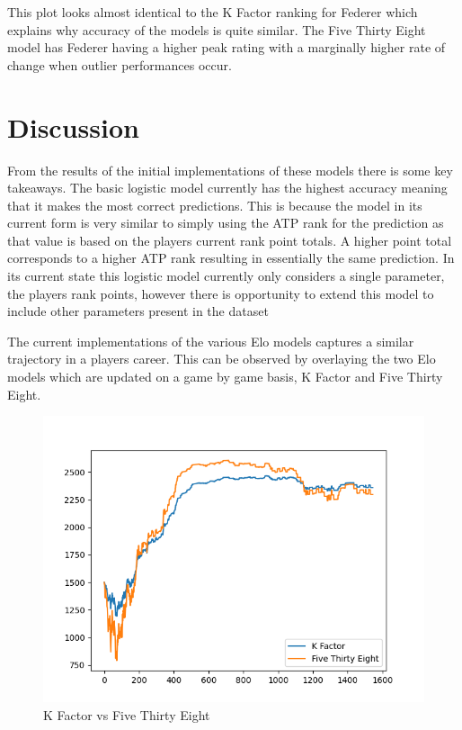 \documentclass[12pt,a4paper]{article}
\begin{document}
This plot looks almost identical to the K Factor ranking for Federer which explains why
accuracy of the models is quite similar. The Five Thirty Eight model has Federer having a
higher peak rating with a marginally higher rate of change when outlier performances occur.

\vspace{10mm}
\noindent \hrulefill

\clearpage
\section{Discussion}
From the results of the initial implementations of these models there is some key
takeaways. The basic logistic model currently has the highest accuracy meaning that it
makes the most correct predictions. This is because the model in its current form is very
similar to simply using the ATP rank for the prediction as that value is based on the players
current rank point totals. A higher point total corresponds to a higher ATP rank resulting
in essentially the same prediction. In its current state this logistic model currently only
considers a single parameter, the players rank points, however there is opportunity to
extend this model to include other parameters present in the dataset

The current implementations of the various Elo models captures a similar trajectory in a
players career. This can be observed by overlaying the two Elo models which are updated
on a game by game basis, K Factor and Five Thirty Eight.
\begin{figure}[H]
  \includegraphics[scale=0.8]{images/federer_comparison.png}
  \caption{K Factor vs Five Thirty Eight}
  \label{fig:federer-k-538}
\end{figure}
\end{document}
